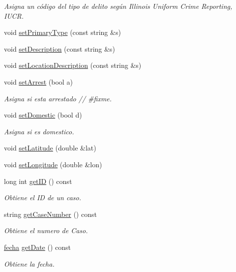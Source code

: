 \begin{DoxyCompactItemize}
\begin{DoxyCompactList}\small\item\em Asigna un código del tipo de delito según Illinois Uniform Crime Reporting, I\+U\+C\+R. \end{DoxyCompactList}\item 
void \hyperlink{classcrimen_a959223f59be38a0cdb28ea29f294f1d3}{set\+Primary\+Type} (const string \&s)
\item 
void \hyperlink{classcrimen_a49fdeeb1b6376fd78bce80e42f670d43}{set\+Description} (const string \&s)
\item 
void \hyperlink{classcrimen_ad3bd97ed5867e3961a77f64a15797e41}{set\+Location\+Description} (const string \&s)
\item 
void \hyperlink{classcrimen_ae08b85470038469179a01ba753b7641a}{set\+Arrest} (bool a)
\begin{DoxyCompactList}\small\item\em Asigna si esta arrestado // \#fixme. \end{DoxyCompactList}\item 
void \hyperlink{classcrimen_a3ec14cf4bb0464350d8efd98d2679d41}{set\+Domestic} (bool d)
\begin{DoxyCompactList}\small\item\em Asigna si es domestico. \end{DoxyCompactList}\item 
void \hyperlink{classcrimen_a10b0917bbef15352657a1ccdbee1a738}{set\+Latitude} (double \&lat)
\item 
void \hyperlink{classcrimen_a8db952f20e2fb3ab6a9124f0a6dcf0a4}{set\+Longitude} (double \&lon)
\item 
long int \hyperlink{classcrimen_a855eab30a304a6498828cb5d85a4e0e3}{get\+I\+D} () const 
\begin{DoxyCompactList}\small\item\em Obtiene el I\+D de un caso. \end{DoxyCompactList}\item 
string \hyperlink{classcrimen_ab3c025eb20cdcea9192ee190fa2af015}{get\+Case\+Number} () const 
\begin{DoxyCompactList}\small\item\em Obtiene el numero de Caso. \end{DoxyCompactList}\item 
\hyperlink{classfecha}{fecha} \hyperlink{classcrimen_a8a6712e536211034819441ab87e1c215}{get\+Date} () const 
\begin{DoxyCompactList}\small\item\em Obtiene la fecha. \end{DoxyCompactList}\item 

\end{DoxyCompactItemize}
